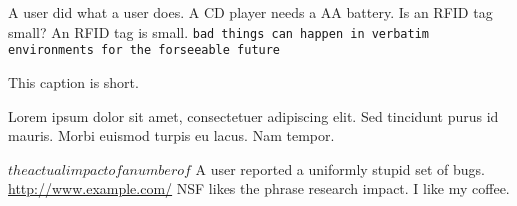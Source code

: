 \begin{comment}
some bad stuff that is in the comment environment and should be ignored.
we we
behavior
fashion
\end{comment}
A user did what a user does.  %
A CD player needs a AA battery.  %
Is an RFID tag small?
An RFID tag is small.
\verb+bad things can happen in verbatim environments for the forseeable future+
\caption{This caption is short.}
\caption[Lorem ipsum dolor sit amet.]{Lorem ipsum dolor sit amet, consectetuer adipiscing elit. Sed tincidunt purus id mauris. Morbi euismod turpis eu lacus. Nam tempor.}
$the actual impact of a number of$ %
A user reported a uniformly stupid set of bugs.
\url{http://www.example.com/}
NSF likes the phrase research impact.
I like my coffee.
